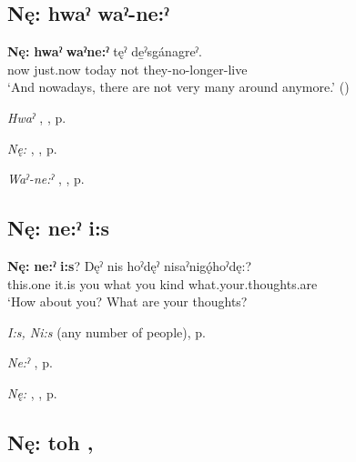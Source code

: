 \subsection*{\textbf{Nę: hwaˀ waˀ-ne:ˀ} } \label{p:[nę: hwaˀ waˀ-ne:ˀ]}

\ea
\label{ex:npar113}
\gll \textbf{Nę:} \textbf{hwaˀ} \textbf{waˀne:ˀ} tęˀ de̱ˀsgánagreˀ. \\
now just.now today not they-no-longer-live\\
\glt ‘And nowadays, there are not very many around anymore.’ (\cite{mithun_how_1980})
\z

\begin{CayugaRelated}
\item \textit{Hwaˀ} , , p. \pageref{p:[hwaˀ]}\\
\item \textit{Nę:} , , p. \pageref{p:[nę:] ‘this, these’}\\
\item \textit{Waˀ-ne:ˀ} , , p. \pageref{p:[waˀ-ne:ˀ]}
\end{CayugaRelated}

\subsection*{\textbf{Nę: ne:ˀ i:s} } \label{p:[nę: ne:ˀ i:s]}

\ea
\label{ex:npar106}
\gll \textbf{Nę:} \textbf{ne:ˀ} \textbf{i:s}? Dęˀ nis hoˀdęˀ nisaˀnigǫ́hoˀdę:? \\
this.one it.is you what you kind what.your.thoughts.are\\
\glt ‘How about you? What are your thoughts?
\z

\begin{CayugaRelated}
\item \textit{I:s, Ni:s}  (any number of people), p. \pageref{p:[i:s]}\\
\item \textit{Ne:ˀ} , p. \pageref{p:[ne:ˀ] `it is’}\\
\item \textit{Nę:} , , p. \pageref{p:[nę:] ‘this, these’}
\end{CayugaRelated}

\subsection*{\textbf{Nę: toh} , } \label{p:[nę: toh]}

